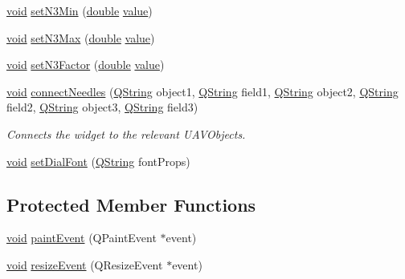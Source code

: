 \begin{DoxyCompactItemize}
\item 
\hyperlink{group___u_a_v_objects_plugin_ga444cf2ff3f0ecbe028adce838d373f5c}{void} \hyperlink{group___dial_plugin_ga0b4a5fbf9c6dcd1f01bd6efff7cc3c26}{set\-N3\-Min} (\hyperlink{_super_l_u_support_8h_a8956b2b9f49bf918deed98379d159ca7}{double} \hyperlink{glext_8h_aa0e2e9cea7f208d28acda0480144beb0}{value})
\item 
\hyperlink{group___u_a_v_objects_plugin_ga444cf2ff3f0ecbe028adce838d373f5c}{void} \hyperlink{group___dial_plugin_gaa3a290185da85f7cd228c785ca2b6cc1}{set\-N3\-Max} (\hyperlink{_super_l_u_support_8h_a8956b2b9f49bf918deed98379d159ca7}{double} \hyperlink{glext_8h_aa0e2e9cea7f208d28acda0480144beb0}{value})
\item 
\hyperlink{group___u_a_v_objects_plugin_ga444cf2ff3f0ecbe028adce838d373f5c}{void} \hyperlink{group___dial_plugin_gad8af67c2847f49c9c2dce641d7105f18}{set\-N3\-Factor} (\hyperlink{_super_l_u_support_8h_a8956b2b9f49bf918deed98379d159ca7}{double} \hyperlink{glext_8h_aa0e2e9cea7f208d28acda0480144beb0}{value})
\item 
\hyperlink{group___u_a_v_objects_plugin_ga444cf2ff3f0ecbe028adce838d373f5c}{void} \hyperlink{group___dial_plugin_ga4b039739f70d00651a6ca39cf5a1997a}{connect\-Needles} (\hyperlink{group___u_a_v_objects_plugin_gab9d252f49c333c94a72f97ce3105a32d}{Q\-String} object1, \hyperlink{group___u_a_v_objects_plugin_gab9d252f49c333c94a72f97ce3105a32d}{Q\-String} field1, \hyperlink{group___u_a_v_objects_plugin_gab9d252f49c333c94a72f97ce3105a32d}{Q\-String} object2, \hyperlink{group___u_a_v_objects_plugin_gab9d252f49c333c94a72f97ce3105a32d}{Q\-String} field2, \hyperlink{group___u_a_v_objects_plugin_gab9d252f49c333c94a72f97ce3105a32d}{Q\-String} object3, \hyperlink{group___u_a_v_objects_plugin_gab9d252f49c333c94a72f97ce3105a32d}{Q\-String} field3)
\begin{DoxyCompactList}\small\item\em Connects the widget to the relevant U\-A\-V\-Objects. \end{DoxyCompactList}\item 
\hyperlink{group___u_a_v_objects_plugin_ga444cf2ff3f0ecbe028adce838d373f5c}{void} \hyperlink{group___dial_plugin_ga47e399b79845057cc9f7eab02fef380a}{set\-Dial\-Font} (\hyperlink{group___u_a_v_objects_plugin_gab9d252f49c333c94a72f97ce3105a32d}{Q\-String} font\-Props)
\end{DoxyCompactItemize}
\subsection*{Protected Member Functions}
\begin{DoxyCompactItemize}
\item 
\hyperlink{group___u_a_v_objects_plugin_ga444cf2ff3f0ecbe028adce838d373f5c}{void} \hyperlink{group___dial_plugin_ga35b76a1088cc50996f66ef23da926785}{paint\-Event} (Q\-Paint\-Event $\ast$event)
\item 
\hyperlink{group___u_a_v_objects_plugin_ga444cf2ff3f0ecbe028adce838d373f5c}{void} \hyperlink{group___dial_plugin_ga4ce19a0118b1518cf0469e2fc69dc86b}{resize\-Event} (Q\-Resize\-Event $\ast$event)
\end{DoxyCompactItemize}


